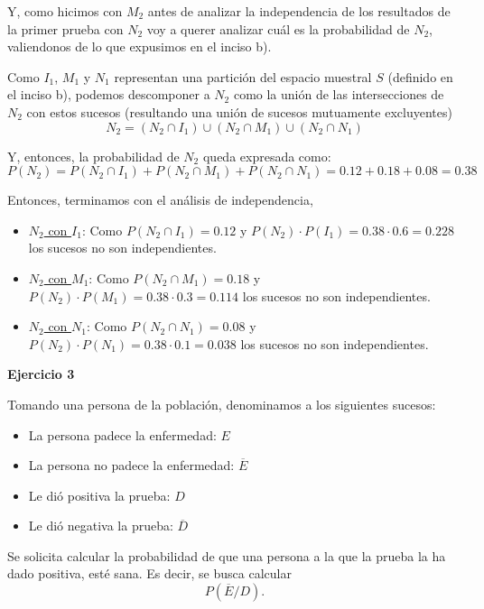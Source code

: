 \documentclass[11pt]{article}
\begin{document}
Y, como hicimos con $M_{2}$ antes de analizar la independencia de los resultados de la primer prueba con $N_{2}$ voy a querer analizar cu\'al es la probabilidad de $N_{2}$, valiendonos de lo que expusimos en el inciso b). 

Como $I_{1}$, $M_{1}$ y $N_{1}$ representan una partici\'on del espacio muestral $S$ (definido en el inciso b), podemos descomponer a $N_{2}$ como la uni\'on de las intersecciones de $N_{2}$ con estos sucesos (resultando una uni\'on de sucesos mutuamente excluyentes)
\[N_{2} = (N_{2} \cap I_{1}) \cup (N_{2} \cap M_{1}) \cup (N_{2} \cap N_{1}) \]

Y, entonces, la probabilidad de $N_{2}$ queda expresada como: 
\[P(N_{2}) = P(N_{2} \cap I_{1}) + P(N_{2} \cap M_{1}) + P(N_{2} \cap N_{1}) = 0.12 + 0.18 + 0.08 = 0.38 \]

Entonces, terminamos con el an\'alisis de independencia,

\begin{itemize}
    \item \underline{$N_{2}$ con $I_{1}$}: Como $P(N_{2}\cap I_{1}) = 0.12$ y $P(N_{2})\cdot P(I_{1}) = 0.38\cdot 0.6 = 0.228$ los sucesos no son independientes. 
    \item \underline{$N_{2}$ con $M_{1}$}: Como $P(N_{2}\cap M_{1}) = 0.18$ y $P(N_{2})\cdot P(M_{1}) = 0.38\cdot 0.3 = 0.114$ los sucesos no son independientes. 
    \item \underline{$N_{2}$ con $N_{1}$}: Como $P(N_{2}\cap N_{1}) = 0.08$ y $P(N_{2})\cdot P(N_{1}) = 0.38\cdot 0.1 = 0.038$ los sucesos no son independientes. 
\end{itemize}

\textbf{Ejercicio 3}

Tomando una persona de la poblaci\'on, denominamos a los siguientes sucesos: 
\begin{itemize}
    \item La persona padece la enfermedad: $E$
    \item La persona no padece la enfermedad: $\overline{E}$
    \item Le di\'o positiva la prueba: $D$
    \item Le di\'o negativa la prueba: $\overline{D}$
\end{itemize}

Se solicita calcular la probabilidad de que una persona a la que la prueba la ha dado positiva, esté sana. Es decir, se busca calcular $$P(\overline{E}/D).$$
\end{document}
